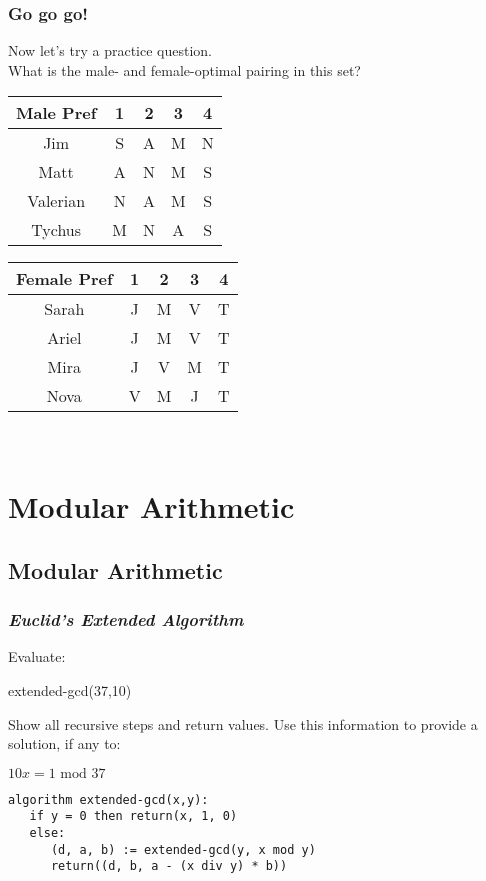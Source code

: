 \documentclass[9pt]{beamer}
\begin{document}
\begin{frame}[fragile]
\frametitle{Go go go!}
Now let's try a practice question.\\ 
What is the male- and female-optimal pairing in this set?\\ %
\begin{tabular}{|c|c|c|c|c|}
\hline
Male Pref & 1 & 2 & 3 & 4\\
\hline
Jim & S & A & M & N\\
Matt & A & N & M & S\\
Valerian & N & A & M & S\\
Tychus & M & N & A & S\\
\hline
\end{tabular}
\quad
\begin{tabular}{|c|c|c|c|c|}
\hline
Female Pref & 1 & 2 & 3 & 4\\
\hline
Sarah & J & M & V & T\\
Ariel & J & M & V & T\\
Mira & J & V & M & T\\
Nova & V & M & J & T\\
\hline
\end{tabular}
\newline
\\
\end{frame}


\section{Modular Arithmetic}
  \subsection{Modular Arithmetic}

\begin{frame}[fragile]
  \frametitle{\emph{Euclid's Extended Algorithm}}
 Evaluate:
 \newline
 \centerline{extended-gcd(37,10)}
 \newline
 \newline
 Show all recursive steps and return values. Use this information to provide a solution, if any to:
 \newline
 \centerline{$10x = 1 \text{ mod } 37$}

\begin{verbatim}
algorithm extended-gcd(x,y):
   if y = 0 then return(x, 1, 0)
   else:
      (d, a, b) := extended-gcd(y, x mod y)
      return((d, b, a - (x div y) * b))
\end{verbatim}

\end{frame}
\end{document}
